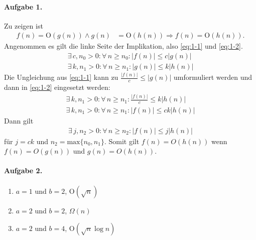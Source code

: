 \documentclass{article}
\newcommand{\bO}{\text{O}}
\begin{document}
\paragraph{Aufgabe 1.}

Zu zeigen ist
\begin{align*}
    f(n) = \bO(g(n)) \land g(n) &= \bO(h(n)) \Rightarrow f(n) = \bO(h(n)).
\end{align*}
Angenommen es gilt die linke Seite der Implikation, also \eqref{eq:1-1} und \eqref{eq:1-2}.
\begin{align}
    \label{eq:1-1}\exists\, c, n_0 > 0 : \forall\, n \geq n_0 : |f(n)| \leq c|g(n)| \\
    \label{eq:1-2}\exists\, k, n_1 > 0 : \forall\, n \geq n_1 : |g(n)| \leq k|h(n)|
\end{align}
Die Ungleichung aus \eqref{eq:1-1} kann zu $\frac{|f(n)|}{c} \leq |g(n)|$ umformuliert werden und dann in \eqref{eq:1-2} eingesetzt werden:
\begin{align*}
    \exists\, k, n_1 > 0 : \forall\, n \geq n_1 : \frac{|f(n)|}{c} \leq k|h(n)| \\
    \exists\, k, n_1 > 0 : \forall\, n \geq n_1 : |f(n)| \leq ck|h(n)|
\end{align*}
Dann gilt
\begin{align*}
    \exists\, j, n_2 > 0 : \forall\, n \geq n_2 : |f(n)| \leq j|h(n)| 
\end{align*}
für $j = ck$ und $n_2 = \text{max}\{n_0, n_1\}$. Somit gilt $f(n) = O(h(n))$ wenn $f(n) = O(g(n))$ und $g(n) = O(h(n))$.

\paragraph{Aufgabe 2.}

\begin{enumerate}
    \item $a = 1$ und $b = 2$, $\bO(\sqrt{n})$
    \item $a = 2$ und $b = 2$, $\Omega(n)$
    \item $a = 2$ und $b = 4$, $\bO(\sqrt{n} \log n)$
\end{enumerate}
\end{document}

